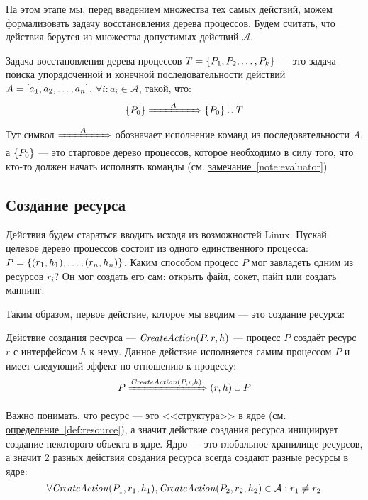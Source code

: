 На этом этапе мы, перед введением множества тех самых действий, можем формализовать задачу восстановления дерева процессов. Будем считать, что действия берутся из множества допустимых действий $\mathcal{A}$.
\begin{defn}
Задача восстановления дерева процессов $T = \left\lbrace P_1, P_2, \ldots, P_k \right\rbrace$ --- это задача поиска упорядоченной и конечной последовательности действий $A = \left[ a_1, a_2, \ldots, a_n \right]$, $\forall i: a_i \in \mathcal{A}$, такой, что:
\begin{equation*}
	\left\lbrace P_0 \right\rbrace \xRightarrow{\qquad A\qquad} \left\lbrace P_0 \right\rbrace \cup T
\end{equation*}
Тут символ $\xRightarrow{\qquad A\qquad}$ обозначает исполнение команд из последовательности $A$, а $\left\lbrace P_0 \right\rbrace$ --- это стартовое дерево процессов, которое необходимо в силу того, что кто-то должен начать исполнять команды (см. \hyperref[note:evaluator]{замечание~\ref*{note:evaluator}})
\end{defn}

\subsection{Создание ресурса}

Действия будем стараться вводить исходя из возможностей Linux. Пускай целевое дерево процессов состоит из одного единственного процесса: $P = \left\lbrace (r_1, h_1), \ldots, (r_n, h_n) \right\rbrace$. Каким способом процесс $P$ мог завладеть одним из ресурсов $r_i$? Он мог создать его сам: открыть файл, сокет, пайп или создать маппинг.

Таким образом, первое действие, которое мы вводим --- это создание ресурса:

\begin{defn}
\label{def:createact}
Действие создания ресурса --- $\text{\textit{CreateAction}}(P, r, h)$ --- процесс $P$ создаёт ресурс $r$ с интерфейсом $h$ к нему. Данное действие исполняется самим процессом $P$ и имеет следующий эффект по отношению к процессу:
\begin{equation*}
	P \xRightarrow{\text{\textit{CreateAction}}(P, r, h)} (r, h) \cup P
\end{equation*}
\end{defn}

\begin{note}
Важно понимать, что ресурс --- это <<структура>> в ядре (см. \hyperref[def:resource]{определение~\ref*{def:resource}}), а значит действие создания ресурса инициирует создание некоторого объекта в ядре. Ядро --- это глобальное хранилище ресурсов, а значит 2 разных действия создания ресурса всегда создают разные ресурсы в ядре:
\begin{equation*}
	\forall \text{\textit{CreateAction}}(P_1, r_1, h_1), \text{\textit{CreateAction}}(P_2, r_2, h_2) \in \mathcal{A}: r_1 \neq r_2
\end{equation*}
\end{note}

